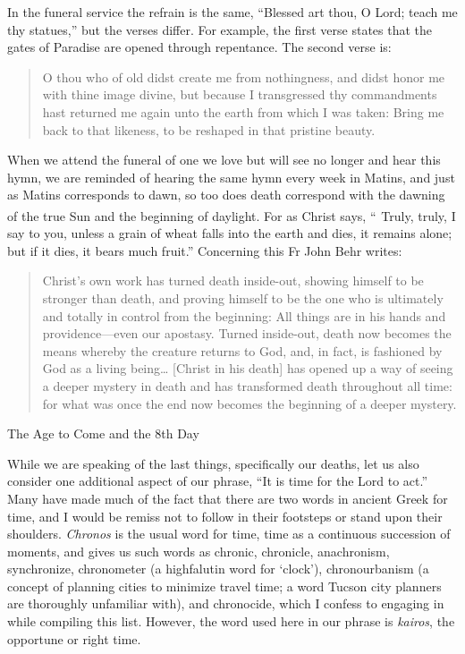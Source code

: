 \documentclass[
]{article}
\begin{document}
In the funeral service the refrain is the same, ``Blessed art thou, O
Lord; teach me thy statues,'' but the verses differ. For example, the
first verse states that the gates of Paradise are opened through
repentance. The second verse is:

\begin{quote}
O thou who of old didst create me from nothingness, and didst honor me
with thine image divine, but because I transgressed thy commandments
hast returned me again unto the earth from which I was taken: Bring me
back to that likeness, to be reshaped in that pristine beauty.
\end{quote}

When we attend the funeral of one we love but will see no longer and
hear this hymn, we are reminded of hearing the same hymn every week in
Matins, and just as Matins corresponds to dawn, so too does death
correspond with the dawning of the true Sun and the beginning of
daylight. For as Christ says, ``\textsuperscript{~}Truly, truly, I say
to you, unless a grain of wheat falls into the earth and dies, it
remains alone; but if it dies, it bears much fruit.'' Concerning this Fr
John Behr writes:

\begin{quote}
Christ's own work has turned death inside-out, showing himself to be
stronger than death, and proving himself to be the one who is ultimately
and totally in control from the beginning: All things are in his hands
and providence---even our apostasy. Turned inside-out, death now becomes
the means whereby the creature returns to God, and, in fact, is
fashioned by God as a living being\ldots{} {[}Christ in his death{]} has
opened up a way of seeing a deeper mystery in death and has transformed
death throughout all time: for what was once the end now becomes the
beginning of a deeper mystery.
\end{quote}

The Age to Come and the 8th Day

While we are speaking of the last things, specifically our deaths, let
us also consider one additional aspect of our phrase, ``It is time for
the Lord to act.'' Many have made much of the fact that there are two
words in ancient Greek for time, and I would be remiss not to follow in
their footsteps or stand upon their shoulders. \emph{Chronos} is the
usual word for time, time as a continuous succession of moments, and
gives us such words as chronic, chronicle, anachronism, synchronize,
chronometer (a highfalutin word for `clock'), chronourbanism (a concept
of planning cities to minimize travel time; a word Tucson city planners
are thoroughly unfamiliar with), and chronocide, which I confess to
engaging in while compiling this list. However, the word used here in
our phrase is \emph{kairos}, the opportune or right time.
\end{document}
